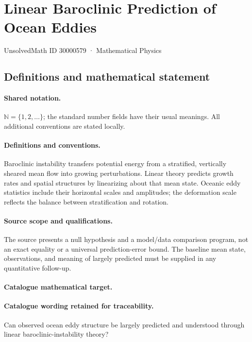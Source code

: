 \documentclass[11pt]{article}
\begin{document}
\setcounter{section}{30000578}
\section{Linear Baroclinic Prediction of Ocean Eddies}\label{30000579}
{\small UnsolvedMath ID 30000579 · Mathematical Physics}
\subsection{Definitions and mathematical statement}

\paragraph{Shared notation.}$\mathbb N=\{1,2,\ldots\}$; the standard number fields have their usual meanings. All additional conventions are stated locally.


\paragraph{Definitions and conventions.} Baroclinic instability transfers potential energy from a stratified, vertically sheared mean flow into growing perturbations. Linear theory predicts growth rates and spatial structures by linearizing about that mean state. Oceanic eddy statistics include their horizontal scales and amplitudes; the deformation scale reflects the balance between stratification and rotation.

\paragraph{Source scope and qualifications.} The source presents a null hypothesis and a model/data comparison program, not an exact equality or a universal prediction-error bound. The baseline mean state, observations, and meaning of largely predicted must be supplied in any quantitative follow-up.

\paragraph{Catalogue mathematical target.}
\paragraph{Catalogue wording retained for traceability.}
Can observed ocean eddy structure be largely predicted and understood through linear baroclinic-instability theory?
\end{document}
